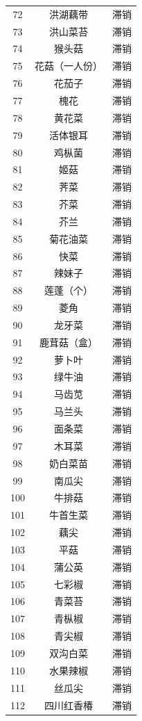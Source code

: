 \documentclass[a4paper,12pt]{article}
\begin{document}
\begin{longtable}{c|c|c}
		72 & 洪湖藕带 & 滞销 \\
		73 & 洪山菜苔 & 滞销 \\
		74 & 猴头菇 & 滞销 \\
		75 & 花菇（一人份） & 滞销 \\
		76 & 花茄子 & 滞销 \\
		77 & 槐花 & 滞销 \\
		78 & 黄花菜 & 滞销 \\
		79 & 活体银耳 & 滞销 \\
		80 & 鸡枞菌 & 滞销 \\
		81 & 姬菇 & 滞销 \\
		82 & 荠菜 & 滞销 \\
		83 & 芥菜 & 滞销 \\
		84 & 芥兰 & 滞销 \\
		85 & 菊花油菜 & 滞销 \\
		86 & 快菜 & 滞销 \\
		87 & 辣妹子 & 滞销 \\
		88 & 莲蓬（个） & 滞销 \\
		89 & 菱角 & 滞销 \\
		90 & 龙牙菜 & 滞销 \\
		91 & 鹿茸菇（盒） & 滞销 \\
		92 & 萝卜叶 & 滞销 \\
		93 & 绿牛油 & 滞销 \\
		94 & 马齿苋 & 滞销 \\
		95 & 马兰头 & 滞销 \\
		96 & 面条菜 & 滞销 \\
		97 & 木耳菜 & 滞销 \\
		98 & 奶白菜苗 & 滞销 \\
		99 & 南瓜尖 & 滞销 \\
		100 & 牛排菇 & 滞销 \\
		101 & 牛首生菜 & 滞销 \\
		102 & 藕尖 & 滞销 \\
		103 & 平菇 & 滞销 \\
		104 & 蒲公英 & 滞销 \\
		105 & 七彩椒 & 滞销 \\
		106 & 青菜苔 & 滞销 \\
		107 & 青枞椒 & 滞销 \\
		108 & 青尖椒 & 滞销 \\
		109 & 双沟白菜 & 滞销 \\
		110 & 水果辣椒 & 滞销 \\
		111 & 丝瓜尖 & 滞销 \\
		112 & 四川红香椿 & 滞销 \\

\end{longtable}
\end{document}

